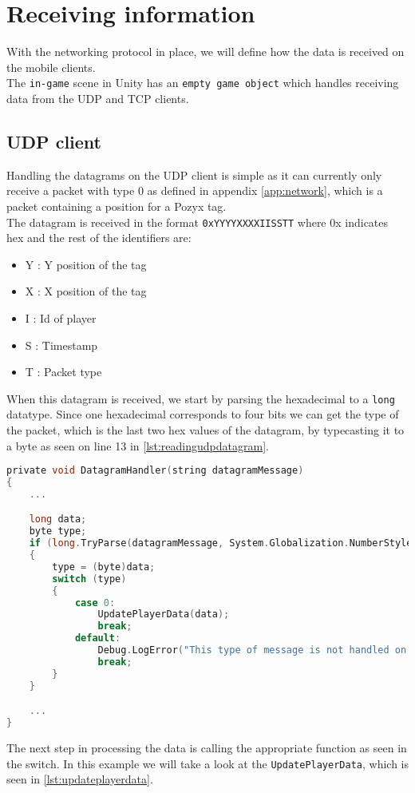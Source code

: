 \section{Receiving information}\label{sec:receiving-the-information}
With the networking protocol in place, we will define how the data is received on the mobile clients.
\\
The \texttt{in-game} scene in Unity has an \texttt{empty game object} which handles receiving data from the UDP and TCP clients.

\subsection*{UDP client}
Handling the datagrams on the UDP client is simple as it can currently only receive a packet with type 0 as defined in appendix \autoref{app:network}, which is a packet containing a position for a Pozyx tag.
\\
The datagram is received in the format \texttt{0xYYYYXXXXIISSTT} where 0x indicates hex and the rest of the identifiers are:
\begin{itemize}
    \item Y : Y position of the tag
    \item X : X position of the tag
    \item I : Id of player
    \item S : Timestamp
    \item T : Packet type
\end{itemize}

\noindent
When this datagram is received, we start by parsing the hexadecimal to a \texttt{long} datatype.
Since one hexadecimal corresponds to four bits we can get the type of the packet, which is the last two hex values of the datagram, by typecasting it to a byte as seen on line 13 in \autoref{lst:readingudpdatagram}.

\begin{lstlisting}[caption={Processing datagrams in UDP client}, captionpos=b,language=C,label={lst:readingudpdatagram}]
private void DatagramHandler(string datagramMessage)
{
    ...

    long data;
    byte type;
    if (long.TryParse(datagramMessage, System.Globalization.NumberStyles.HexNumber, System.Globalization.CultureInfo.InvariantCulture, out data))
    {
        type = (byte)data;
        switch (type)
        {
            case 0:
                UpdatePlayerData(data);
                break;
            default:
                Debug.LogError("This type of message is not handled on UDP");
                break;
        }
    }

    ...
}
\end{lstlisting}
\noindent
The next step in processing the data is calling the appropriate function as seen in the switch.
In this example we will take a look at the \texttt{UpdatePlayerData}, which is seen in \autoref{lst:updateplayerdata}.

